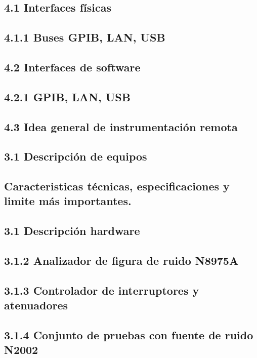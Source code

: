 \documentclass[paper=letter,oneside,fontsize=10pt,parskip=full]{article}
\begin{document}
\subsection{4.1 Interfaces físicas}
\subsection{4.1.1 Buses GPIB, LAN, USB}
\subsection{4.2 Interfaces de software}
\subsection{4.2.1 GPIB, LAN, USB}
\subsection{4.3 Idea general de instrumentación remota}
\subsection{}
\subsection{}
\subsection{3.1 Descripción de equipos}
\subsection{Caracteristicas técnicas, especificaciones y limite más importantes.}
\subsection{3.1 Descripción hardware}
\subsection{3.1.2 Analizador de figura de ruido N8975A}
\subsection{3.1.3 Controlador de interruptores y atenuadores}
\subsection{3.1.4 Conjunto de pruebas con fuente de ruido N2002}
\end{document}
